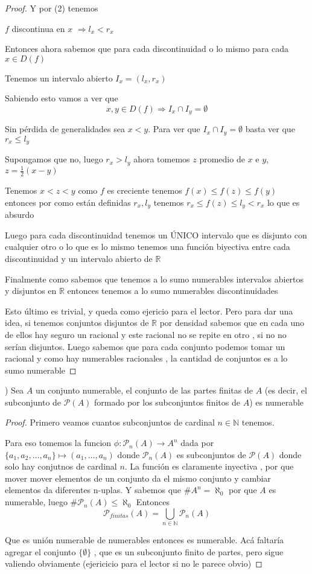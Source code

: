 \documentclass[12pt]{article}
\newcommand{\n}{\aleph_{0}}
\newcommand{\R}{\mathbb{R}}
\newcommand{\N}{\mathbb{N}}
\newcommand{\Ra}{\Rightarrow}
\newcommand{\ra}{\rightarrow}
\theoremstyle{definition}
\begin{document}
\begin{proof}
  Y por (2) tenemos \begin{center} $f$ discontinua en $x$ $\Ra l_{x} < r_{x}$ \end{center}

  Entonces ahora sabemos que para cada discontinuidad o lo mismo para cada $x \in D(f)$

  Tenemos un intervalo abierto $I_{x} = (l_{x},r_{x})$

  Sabiendo esto vamos a ver que $$x ,y \in D(f) \Ra I_{x} \cap I_{y} = \emptyset $$

  Sin pérdida de generalidades sea $x < y$. Para ver que $I_{x} \cap I_{y} = \emptyset$ basta ver que $r_{x} \leq l_{y}$

  Supongamos que no, luego $r_{x} > l_{y}$ ahora tomemos $z$ promedio de $x$ e $y$, $z = \frac{1}{2} (x - y)$

  Tenemos $x < z < y$ como $f$ es creciente tenemos $f(x) \leq f(z) \leq f(y)$ entonces por como están definidas $r_x,l_y$  tenemos $r_{x} \leq f(z) \leq l_{y} < r_{x}$ lo que es absurdo

  Luego para cada discontinuidad tenemos un ÚNICO intervalo que es disjunto con cualquier otro  o lo que es lo mismo tenemos una función biyectiva entre cada discontinuidad y un intervalo abierto de $\R$

  Finalmente como sabemos que tenemos a lo sumo numerables intervalos abiertos y disjuntos en $\R$ entonces tenemos a lo sumo numerables discontinuidades 
  
  Esto último es trivial, y queda como ejericio para el lector. Pero para dar una idea, si tenemos conjuntos disjuntos de $\R$ por densidad sabemos que en cada uno de ellos hay seguro un racional y este racional no se repite en otro , si no no serían disjuntos. Luego sabemos que para cada conjunto podemos tomar un racional y como hay numerables racionales , la cantidad de conjuntos es a lo sumo numerable 
\end{proof}

) Sea $A$ un conjunto numerable, el conjunto de las partes finitas de $A$ (es decir, el subconjunto de $\mathcal{P}(A)$ formado por los subconjuntos finitos de $A$) es numerable

\begin{proof}
  Primero veamos cuantos subconjuntos de cardinal $n \in \N$ tenemos.

  Para eso tomemos la funcion $ \phi :  \mathcal{P}_{n}(A) \ra A^n$ dada por $\{a_{1}, a_{2} ,\dots , a_{n}\} \mapsto  (a_{1}, \dots , a_{n}) $ donde $\mathcal{P}_{n}(A)$ es subconjuntos de $\mathcal{P}(A)$ donde solo hay conjutnos de cardinal $n$. La función es claramente inyectiva , por que mover mover elementos de un conjunto da el mismo conjunto y cambiar elementos da diferentes n-uplas. Y sabemos que $\# A^{n} = \n$ por que $A$ es numerable, luego $\# \mathcal{P}_{n}(A) \leq \n$
  Entonces $$ \mathcal{P}_{finitas}(A) = \bigcup_{n \in \N} \mathcal{P}_{n}(A)$$

  Que es unión numerable de numerables entonces es numerable. Acá faltaría agregar el conjunto $\{\emptyset\}$ , que es un subconjunto finito de partes, pero sigue valiendo obviamente (ejericicio para el lector si no le parece obvio)
\end{proof}
\end{document}
